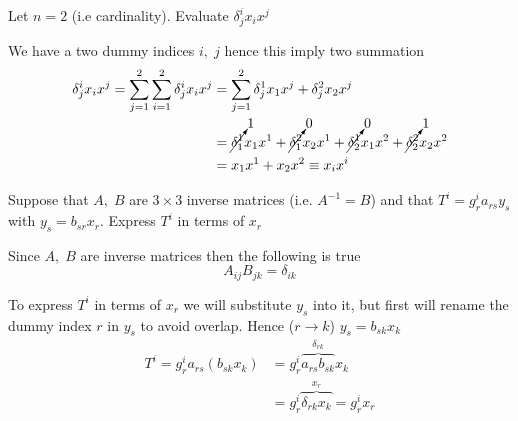 \documentclass[../main.tex]{subfiles}
\begin{document}
		\begin{example}
			Let $n=2$ (i.e cardinality). Evaluate $\delta_j^i x_i x^j$ 
		\end{example}
		\begin{solution}
			We have a two dummy indices $i, \; j$ hence this imply two summation
			\begin{align*}
				\delta_j^i x_i x^j = \sum_{j=1}^2 \sum_{i=1}^2 \delta_j^i x_i x^j 	&= \sum_{j=1}^2 \delta_j^1 x_1 x^j + \delta_j^2 x_2 x^j \\
																			&= \cancelto{1}{\delta_1^1} x_1 x^1 + \cancelto{0}{\delta_1^2} x_2 x^1 + \cancelto{0}{\delta_2^1} x_1 x^2 + \cancelto{1}{\delta_2^2} x_2 x^2 \\
																			&= x_1 x^1 + x_2 x^2 \equiv x_i x^i
			\end{align*}
		\end{solution}
				
		
		\begin{example}
			Suppose that $A, \; B$ are $3 \times 3$ inverse matrices (i.e. $A^{-1} = B$) and that $T^i = g_r^i a_{rs} y_s$ with $y_s = b_{sr} x_r$. Express $T^i$ in terms of $x_r$
		\end{example}	
		\begin{solution}
			Since $A, \; B$ are inverse matrices then the following is true
			\begin{equation*}
				A_{ij} B_{jk} = \delta_{ik}			
			\end{equation*}
			
			To express $T^i$ in terms of $x_r$ we will substitute $y_s$ into it, but first will rename the dummy index $r$ in $y_s$ to avoid overlap. Hence ($r \rightarrow k$) $y_s = b_{sk} x_k$ 
			\begin{align*}
				T^i = g_r^i a_{rs} (b_{sk} x_k) &= g_r^i \overbrace{a_{rs} b_{sk}}^{\delta_{rk}} x_k \\
												&= g_r^i \overbrace{\delta_{rk} x_k}^{x_r} = g_r^i x_r
			\end{align*}
		\end{solution}
		
\end{document}

